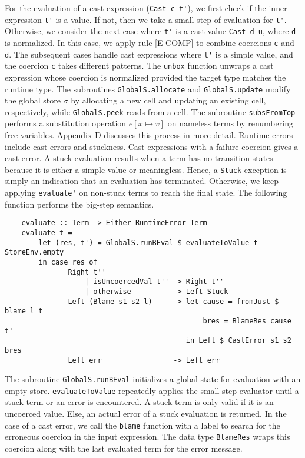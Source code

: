 For the evaluation of a cast expression (\lstinline{Cast c t'}), 
we first check if the inner expression \lstinline{t'} is a value. If not, then 
we take a small-step of evaluation for \lstinline{t'}. Otherwise, 
we consider the next case where \lstinline{t'} is a cast value   
\lstinline{Cast d u}, where \lstinline{d} is normalized. In this 
case, we apply rule {\scriptsize{[E-COMP]}} to combine coercions \lstinline{c} 
and \lstinline{d}. The subsequent cases handle cast expressions where 
\lstinline{t'} is a simple value, and the coercion \lstinline{c} takes 
different patterns. The 
\lstinline{unbox} function unwraps a cast expression whose coercion is normalized 
provided the target type matches the runtime type.    
The subroutines \lstinline{GlobalS.allocate} and \lstinline{GlobalS.update} 
modify the global store $\sigma$ by allocating a new cell and 
updating an existing cell, respectively, while \lstinline{GlobalS.peek} 
reads from a cell. The subroutine \lstinline{subsFromTop} 
performs a substitution 
operation $e[x \mapsto v]$ on nameless terms by renumbering 
free variables. Appendix D discusses this process in more detail. 
Runtime errors include cast errors and stuckness. Cast expressions 
with a failure coercion gives a cast error. 
A stuck evaluation results when a term has no transition states 
because it is either a simple value or meaningless. Hence, a \lstinline{Stuck} 
exception is simply an indication that an evaluation has 
terminated. Otherwise, 
we keep applying \lstinline{evaluate'} on non-stuck terms 
to reach the final state. The following 
function performs the big-step semantics. 

\begin{lstlisting}
    evaluate :: Term -> Either RuntimeError Term
    evaluate t = 
        let (res, t') = GlobalS.runBEval $ evaluateToValue t StoreEnv.empty
        in case res of
               Right t'' 
                   | isUncoercedVal t'' -> Right t''
                   | otherwise          -> Left Stuck 
               Left (Blame s1 s2 l)     -> let cause = fromJust $ blame l t
                                               bres = BlameRes cause t'
                                           in Left $ CastError s1 s2 bres  
               Left err                 -> Left err 
\end{lstlisting}

The subroutine \lstinline{GlobalS.runBEval} initializes a global state 
for evaluation with an empty store. \lstinline{evaluateToValue} repeatedly 
applies the small-step evaluator until a stuck term or an error is encountered. 
A stuck term is only valid if it is an uncoerced value. Else, an actual error 
of a stuck evaluation is returned. In the case of a cast error, we call the 
\lstinline{blame} function with a label to search for the erroneous 
coercion in the input expression. The data type \lstinline{BlameRes} 
wraps this coercion along with the last evaluated term for the error message. 

